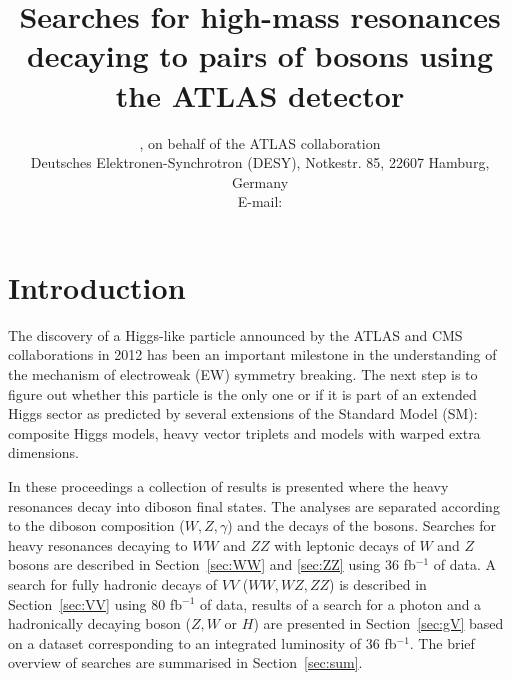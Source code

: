 \documentclass{PoS}
\title{Searches for high-mass resonances decaying to pairs of bosons using the ATLAS detector}
\author{\speaker{Kirill Grevtsov}, {on behalf of the ATLAS collaboration}\\%
        Deutsches Elektronen-Synchrotron (DESY), Notkestr. 85, 22607 Hamburg, Germany\\
        E-mail: \email{kirill.grevtsov@cern.ch}}
\begin{document}

\vspace*{-10mm}
\section{Introduction}
\vspace*{-2mm}
The discovery of a Higgs-like particle announced by the ATLAS and CMS collaborations in 2012 \cite{HIGG-2012-27,CMS-HIG-12-028} has been an important milestone in the understanding of the mechanism of electroweak (EW) symmetry breaking. %
The next step is to figure out whether this particle is the only one or if it is part of an extended Higgs sector as predicted by several extensions of the Standard Model (SM): composite Higgs models, heavy vector triplets and models with warped extra dimensions.


In these proceedings a collection of results is presented where the heavy resonances decay into diboson final states. 
The analyses are separated according to the diboson composition ($W,Z, \gamma$) and the decays of the bosons. 
Searches for heavy resonances decaying to $WW$ and $ZZ$ with leptonic decays of $W$ and $Z$ bosons are described in Section~\ref{sec:WW} and \ref{sec:ZZ} using 36 fb$^{-1}$ of data.
A search for fully hadronic decays of $VV$ ($WW, WZ, ZZ$) is described in Section~\ref{sec:VV} using 80 fb$^{-1}$ of data, results of a search for a photon and a hadronically decaying boson ($Z,W$ or $H$) are presented in Section~\ref{sec:gV} based on a dataset corresponding to an integrated luminosity of 36 fb$^{-1}$. 
The brief overview of searches are summarised in Section~\ref{sec:sum}.

\vspace*{-2mm}
\end{document}
